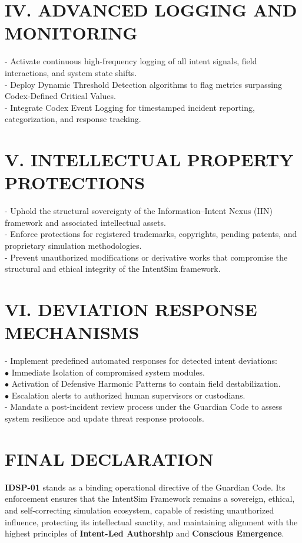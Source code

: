 \documentclass[12pt]{article}
\begin{document}
\section*{IV. ADVANCED LOGGING AND MONITORING}
- Activate continuous high-frequency logging of all intent signals, field interactions, and system state shifts. \\
- Deploy Dynamic Threshold Detection algorithms to flag metrics surpassing Codex-Defined Critical Values. \\
- Integrate Codex Event Logging for timestamped incident reporting, categorization, and response tracking. \\

\section*{V. INTELLECTUAL PROPERTY PROTECTIONS}
- Uphold the structural sovereignty of the Information–Intent Nexus (IIN) framework and associated intellectual assets. \\
- Enforce protections for registered trademarks, copyrights, pending patents, and proprietary simulation methodologies. \\
- Prevent unauthorized modifications or derivative works that compromise the structural and ethical integrity of the IntentSim framework. \\

\section*{VI. DEVIATION RESPONSE MECHANISMS}
- Implement predefined automated responses for detected intent deviations: \\
    \hspace*{1cm} $\bullet$ Immediate Isolation of compromised system modules. \\
    \hspace*{1cm} $\bullet$ Activation of Defensive Harmonic Patterns to contain field destabilization. \\
    \hspace*{1cm} $\bullet$ Escalation alerts to authorized human supervisors or custodians. \\
- Mandate a post-incident review process under the Guardian Code to assess system resilience and update threat response protocols. \\

\section*{FINAL DECLARATION}
\textbf{IDSP-01} stands as a binding operational directive of the Guardian Code. Its enforcement ensures that the IntentSim Framework remains a sovereign, ethical, and self-correcting simulation ecosystem, capable of resisting unauthorized influence, protecting its intellectual sanctity, and maintaining alignment with the highest principles of \textbf{Intent-Led Authorship} and \textbf{Conscious Emergence}. \\
\end{document}
